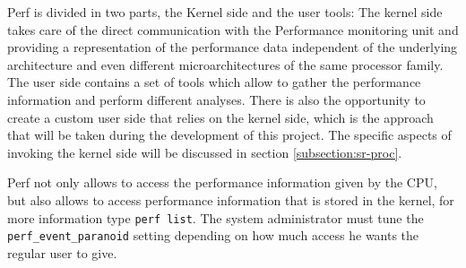 Perf is divided in two parts, the Kernel side and the user tools: The kernel side takes care of the direct communication with the Performance monitoring unit and providing a representation of the performance data independent of the underlying architecture and even different microarchitectures of the same processor family. The user side contains a set of tools which allow to gather the performance information and perform different analyses. There is also the opportunity to create a custom user side that relies on the kernel side, which is the approach that will be taken during the development of this project. The specific aspects of invoking the kernel side will be discussed in section \ref{subsection:sr-proc}.

Perf not only allows to access the performance information given by the CPU, but also allows to access performance information that is stored in the kernel, for more information type \texttt{perf list}. The system administrator must tune the \texttt{perf\_event\_paranoid} setting depending on how much access he wants the regular user to give. 